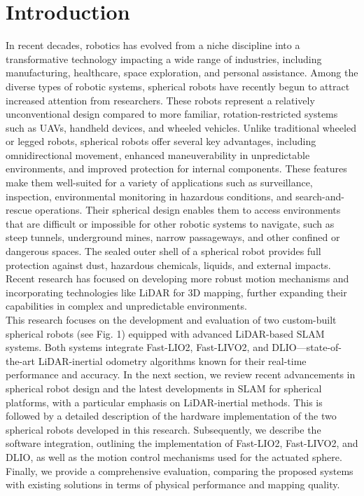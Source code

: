 \documentclass[conference]{IEEEtran}
\begin{document}
\section{Introduction}
In recent decades, robotics has evolved from a niche discipline into a transformative technology impacting a wide range of industries, including manufacturing, healthcare, space exploration, and personal assistance. Among the diverse types of robotic systems, spherical robots have recently begun to attract increased attention from researchers. These robots represent a relatively unconventional design compared to more familiar, rotation-restricted systems such as UAVs, handheld devices, and wheeled vehicles. Unlike traditional wheeled or legged robots, spherical robots offer several key advantages, including omnidirectional movement, enhanced maneuverability in unpredictable environments, and improved protection for internal components. These features make them well-suited for a variety of applications such as surveillance, inspection, environmental monitoring in hazardous conditions, and search-and-rescue operations. Their spherical design enables them to access environments that are difficult or impossible for other robotic systems to navigate, such as steep tunnels, underground mines, narrow passageways, and other confined or dangerous spaces.
The sealed outer shell of a spherical robot provides full protection against dust, hazardous chemicals, liquids, and external impacts. Recent research has focused on developing more robust motion mechanisms \cite{roboball,novelsphere,pendulum_sphere} and incorporating technologies like LiDAR for 3D mapping, further expanding their capabilities in complex and unpredictable environments\cite{Kalman_filter_sphere,DAEDALUS,sphere_Fabi_1}.\\
\hspace*{1em}This research focuses on the development and evaluation of two custom-built spherical robots (see Fig. 1) equipped with advanced LiDAR-based SLAM systems. Both systems integrate Fast-LIO2\cite{fastlio2}, Fast-LIVO2\cite{fastlivo2}, and DLIO\cite{dlio}—state-of-the-art LiDAR-inertial odometry algorithms known for their real-time performance and accuracy.
In the next section, we review recent advancements in spherical robot design and the latest developments in SLAM for spherical platforms, with a particular emphasis on LiDAR-inertial methods. This is followed by a detailed description of the hardware implementation of the two spherical robots developed in this research. Subsequently, we describe the software integration, outlining the implementation of Fast-LIO2, Fast-LIVO2, and DLIO, as well as the motion control mechanisms used for the actuated sphere. Finally, we provide a comprehensive evaluation, comparing the proposed systems with existing solutions in terms of physical performance and mapping quality.
\end{document}
